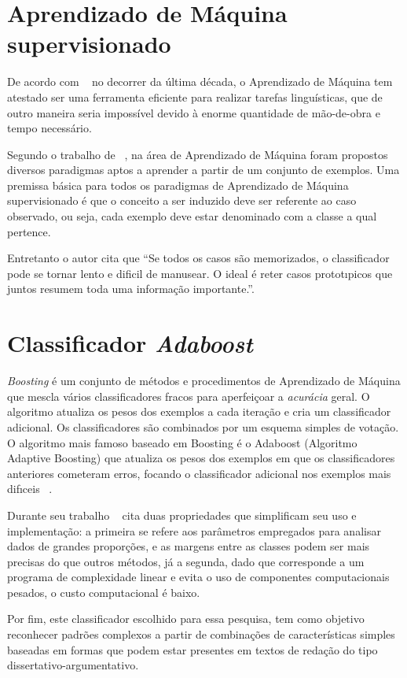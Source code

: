 \section{Aprendizado de Máquina supervisionado}

De acordo com ~\cite{de2005anotaccao} no decorrer da última década, o Aprendizado de Máquina tem atestado ser uma ferramenta eficiente para realizar tarefas linguísticas, que de outro maneira seria impossível devido à enorme quantidade de mão-de-obra e tempo necessário. 

Segundo o trabalho de ~\cite{batista2003pre}, na área de Aprendizado de Máquina foram propostos diversos paradigmas aptos a aprender a partir de um conjunto de exemplos. Uma premissa básica para todos os paradigmas de Aprendizado de Máquina supervisionado é que o conceito a ser induzido deve ser referente ao caso observado, ou seja, cada exemplo deve estar denominado com a classe a qual pertence. 

Entretanto o autor cita que ``Se todos os casos são memorizados, o classificador pode se tornar lento e dificil de manusear. O ideal é reter casos prototıpicos que juntos resumem toda uma informação importante.''.

\section{Classificador \textit{Adaboost}}

\textit{Boosting} é um conjunto de métodos e procedimentos de Aprendizado de Máquina que mescla vários classificadores fracos para aperfeiçoar a \textit{acurácia} geral. O algoritmo atualiza os pesos dos exemplos a cada iteração e cria um classificador adicional. Os classificadores são combinados por um esquema simples de votação. O algoritmo mais famoso baseado em Boosting é o Adaboost (Algoritmo Adaptive Boosting) que atualiza os pesos dos exemplos em que os classificadores anteriores cometeram erros, focando o classificador adicional nos exemplos mais difıceis ~\cite {duarte2009algoritmo}.

Durante seu trabalho ~\cite{merjildo2013algoritmo} cita duas propriedades que simplificam seu uso e implementação: a primeira se refere aos parâmetros empregados para analisar dados de grandes proporções,
e as margens entre as classes podem ser mais precisas do que outros métodos, já a segunda, dado que corresponde a um programa de complexidade linear e evita o uso de componentes computacionais pesados, o custo computacional é baixo.

Por fim, este classificador escolhido para essa pesquisa, tem como objetivo reconhecer padrões complexos a partir de combinações de características simples baseadas em formas que podem estar presentes em textos de redação do tipo dissertativo-argumentativo.
